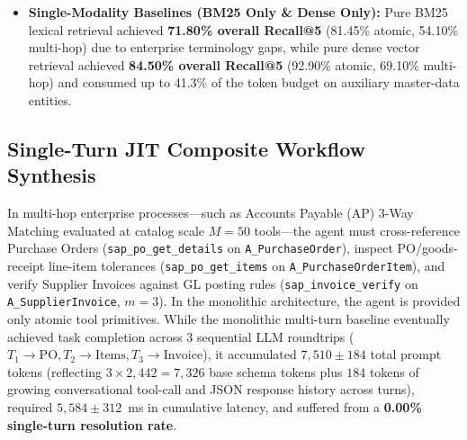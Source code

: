 \documentclass[conference,10pt]{IEEEtran}
\begin{document}
\begin{itemize}
Stage 2 zero-shot BFS composite synthesis was enabled on the 60 external multi-hop workflows) and an 86.4\% token reduction vs.\ 81.33\% Recall@5 for RAG-MCP and 79.33\% for ToolRetriever.
    \item \textbf{Single-Modality Baselines (BM25 Only \& Dense Only):} Pure BM25 lexical retrieval achieved \textbf{71.80\% overall Recall@5} (81.45\% atomic, 54.10\% multi-hop) due to enterprise terminology gaps, while pure dense vector retrieval achieved \textbf{84.50\% overall Recall@5} (92.90\% atomic, 69.10\% multi-hop) and consumed up to 41.3\% of the token budget on auxiliary master-data entities.
\end{itemize}

\subsection{Single-Turn JIT Composite Workflow Synthesis}
In multi-hop enterprise processes—such as Accounts Payable (AP) 3-Way Matching evaluated at catalog scale $M = 50$ tools—the agent must cross-reference Purchase Orders (\texttt{sap\_po\_get\_details} on \texttt{A\_PurchaseOrder}), inspect PO/goods-receipt line-item tolerances (\texttt{sap\_po\_get\_items} on \texttt{A\_PurchaseOrderItem}), and verify Supplier Invoices against GL posting rules (\texttt{sap\_invoice\_verify} on \texttt{A\_SupplierInvoice}, $m = 3$). In the monolithic architecture, the agent is provided only atomic tool primitives. While the monolithic multi-turn baseline eventually achieved task completion across 3 sequential LLM roundtrips ($T_1 \to \text{PO}, T_2 \to \text{Items}, T_3 \to \text{Invoice}$), it accumulated $7{,}510 \pm 184$ total prompt tokens (reflecting $3 \times 2{,}442 = 7{,}326$ base schema tokens plus $184$ tokens of growing conversational tool-call and JSON response history across turns), required $5{,}584 \pm 312$~ms in cumulative latency, and suffered from a \textbf{0.00\% single-turn resolution rate}.
\end{document}

